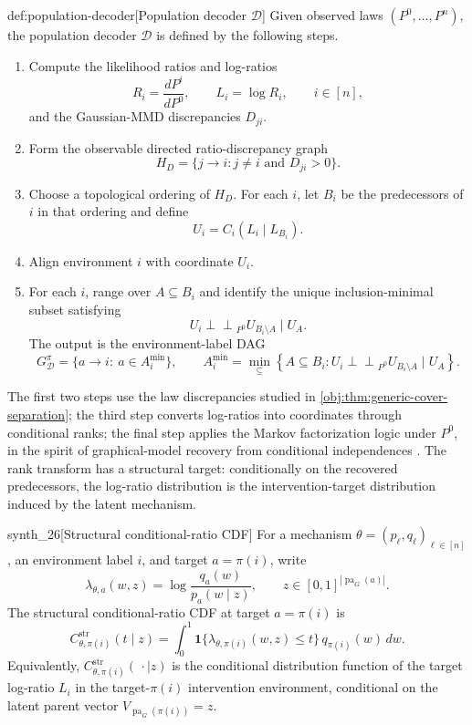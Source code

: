\documentclass[11pt]{article}
\begin{document}
\begin{algorithmv}{def:population-decoder}[Population decoder $\mathscr D$]
Given observed laws \((P^0,\ldots,P^n)\), the population decoder \(\mathscr D\) is defined by the following steps.
\begin{enumerate}
\item Compute the likelihood ratios and log-ratios
\[
R_i=\frac{dP^i}{dP^0},
\qquad
L_i=\log R_i,
\qquad i\in[n],
\]
and the Gaussian-MMD discrepancies \(D_{ji}\).

\item Form the observable directed ratio-discrepancy graph
\[
H_D=\{j\to i:j\ne i\text{ and }D_{ji}>0\}.
\]

\item Choose a topological ordering of \(H_D\). For each \(i\), let \(B_i\) be the predecessors of \(i\) in that ordering and define
\[
U_i=C_i(L_i\mid L_{B_i}).
\]

\item Align environment \(i\) with coordinate \(U_i\).

\item For each \(i\), range over \(A\subseteq B_i\) and identify the unique inclusion-minimal subset satisfying
\[
U_i\mathbin{\perp\!\!\!\perp}_{P^0}U_{B_i\setminus A}\mid U_A.
\]
The output is the environment-label DAG
\[
G^\pi_{\mathscr D}
=
\{a\to i:\ a\in A_i^{\min}\},
\qquad
A_i^{\min}
=
\min_{\subseteq}
\left\{
A\subseteq B_i:
U_i\mathbin{\perp\!\!\!\perp}_{P^0}U_{B_i\setminus A}\mid U_A
\right\}.
\]
\end{enumerate}
\end{algorithmv}

The first two steps use the law discrepancies studied in \cref{obj:thm:generic-cover-separation}; the third step converts log-ratios into coordinates through conditional ranks; the final step applies the Markov factorization logic under \(P^0\), in the spirit of graphical-model recovery from conditional independences \citep{Pearl2009,SpirtesGlymourScheines2000}. The rank transform has a structural target: conditionally on the recovered predecessors, the log-ratio distribution is the intervention-target distribution induced by the latent mechanism.

\begin{definitionv}{synth_26}[Structural conditional-ratio CDF]
For a mechanism \(\theta=(p_\ell,q_\ell)_{\ell\in[n]}\), an environment label \(i\), and target \(a=\pi(i)\), write
\[
\lambda_{\theta,a}(w,z)
=
\log\frac{q_a(w)}{p_a(w\mid z)},
\qquad z\in[0,1]^{|\operatorname{pa}_G(a)|}.
\]
The structural conditional-ratio CDF at target \(a=\pi(i)\) is
\[
C_{\theta,\pi(i)}^{\mathrm{str}}(t\mid z)
=
\int_0^1
\mathbf 1\{\lambda_{\theta,\pi(i)}(w,z)\le t\}\,
q_{\pi(i)}(w)\,dw .
\]
Equivalently, \(C_{\theta,\pi(i)}^{\mathrm{str}}(\,\cdot\mid z)\) is the conditional distribution function of the target log-ratio \(L_i\) in the target-\(\pi(i)\) intervention environment, conditional on the latent parent vector \(V_{\operatorname{pa}_G(\pi(i))}=z\).
\end{definitionv}
\end{document}
